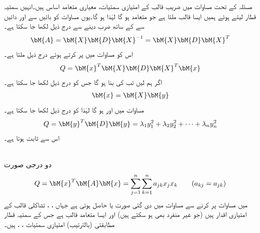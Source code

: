 مسئلہ  کے تحت مساوات  میں   ضریب  قالب  کے امتیازی سمتیات، معیاری  متعامد اساس ہیں۔انہیں سمتیہ قطار لیتے ہوئے ہمیں ایسا قالب  ملتا ہے جو متعامد ہو گا لہٰذا  ہو گا۔یوں مساوات  کو بائیں سے  اور دائیں سے  کے ساتھ ضرب دینے سے درج ذیل لکھا جا سکتا ہے۔
\begin{align*}
\bM{A}=\bM{X}\bM{D}\bM{X}^{-1}=\bM{X}\bM{D}\bM{X}^T
\end{align*}
اس کو مساوات  میں پر کرتے ہوئے درج ذیل ملتا ہے۔
\begin{align}\label{مساوات_امتیازی_صدر_وتر_الف}
Q=\bM{x}^T\bM{X}\bM{D}\bM{X}^T\bM{x}
\end{align}
اگر ہم  لیں تب  کی بنا  ہو گا جس کو درج ذیل لکھا جا سکتا ہے۔
\begin{align}\label{مساوات_امتیازی_صدر_وتر_ب}
\bM{x}=\bM{X}\bM{y}
\end{align}  
مساوات  میں  اور  ہو گا لہٰذا  کو درج ذیل لکھا جا سکتا ہے۔
\begin{align}\label{مساوات_امتیازی_صدر_وتر_پ}
Q=\bM{y}^T\bM{D}\bM{y}=\lambda_1y_1^2+\lambda_2y_2^2+\cdots+\lambda_ny_n^2
\end{align}
اس سے    ثابت ہوتا ہے۔

\quad {}\\
دو درجی صورت
\begin{align}\label{مساوات_امتیازی_صدر_وتر_ت}
Q=\bM{x}^T\bM{A}\bM{x}=\sum_{j=1}^{n}\sum_{k=1}^{n}a_{jk}x_jx_k\quad \quad (a_{kj}=a_{jk})
\end{align}
میں مساوات  پر کرنے سے مساوات  میں دی گئی  صورت یا  حاصل ہوتی ہے جہاں ، ،  تشاکلی قالب  کے امتیازی اقدار ہیں (جو غیر منفرد بھی ہو سکتے ہیں) اور  ایسا متعامد قالب ہے جس کے سمتیہ قطار  مطابقتی (بالترتیب)  امتیازی سمتیات ، ،  ہیں۔

